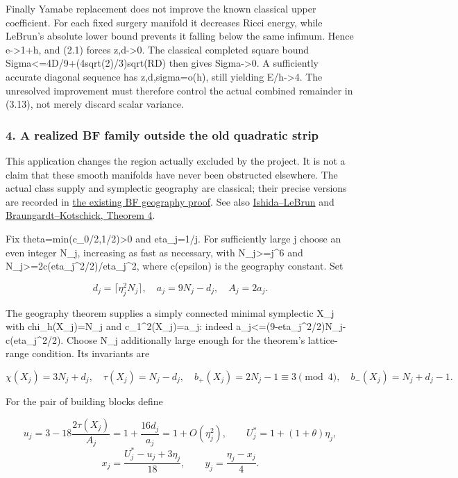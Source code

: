 \documentclass[
  10pt,
]{article}
\begin{document}
Finally Yamabe replacement does not improve the known classical upper
coefficient. For each fixed surgery manifold it decreases Ricci energy,
while LeBrun's absolute lower bound prevents it falling below the same
infimum. Hence e-\textgreater1+h, and (2.1) forces z,d-\textgreater0.
The classical completed square bound
Sigma\textless=4D/9+(4sqrt(2)/3)sqrt(RD) then gives Sigma-\textgreater0.
A sufficiently accurate diagonal sequence has z,d,sigma=o(h), still
yielding E/h-\textgreater4. The unresolved improvement must therefore
control the actual combined remainder in (3.13), not merely discard
scalar variance.

\hypertarget{a-realized-bf-family-outside-the-old-quadratic-strip}{%
\subsubsection{4. A realized BF family outside the old quadratic
strip}\label{a-realized-bf-family-outside-the-old-quadratic-strip}}

This application changes the region actually excluded by the project. It
is not a claim that these smooth manifolds have never been obstructed
elsewhere. The actual class supply and symplectic geography are
classical; their precise versions are recorded in
\href{../mathematics/current/line1_bauer_furuta_geography.md}{the
existing BF geography proof}. See also
\href{https://arxiv.org/html/math/0111228}{Ishida--LeBrun} and
\href{https://arxiv.org/pdf/math/0306021}{Braungardt--Kotschick, Theorem
4}.

Fix theta=min(c\_0/2,1/2)\textgreater0 and eta\_j=1/j. For sufficiently
large j choose an even integer N\_j, increasing as fast as necessary,
with N\_j\textgreater=j\^{}6 and
N\_j\textgreater=2c(eta\_j\^{}2/2)/eta\_j\^{}2, where c(epsilon) is the
geography constant. Set

\[
 d_j=\lceil\eta_j^2N_j\rceil,\quad a_j=9N_j-d_j,
 \quad A_j=2a_j.
\]

The geography theorem supplies a simply connected minimal symplectic
X\_j with chi\_h(X\_j)=N\_j and c\_1\^{}2(X\_j)=a\_j: indeed
a\_j\textless=(9-eta\_j\^{}2/2)N\_j-c(eta\_j\^{}2/2). Choose N\_j
additionally large enough for the theorem's lattice-range condition. Its
invariants are

\[
 \chi(X_j)=3N_j+d_j,\quad \tau(X_j)=N_j-d_j,\quad
 b_+(X_j)=2N_j-1\equiv3\pmod4,\quad b_-(X_j)=N_j+d_j-1.
\]

For the pair of building blocks define

\[
 u_j=3-18\frac{2\tau(X_j)}{A_j}
     =1+\frac{16d_j}{a_j}=1+O(\eta_j^2),\qquad
 U_j^*=1+(1+\theta)\eta_j,
\] \[
 x_j=\frac{U_j^*-u_j+3\eta_j}{18},\qquad
 y_j=\frac{\eta_j-x_j}{4}.
\]
\end{document}
